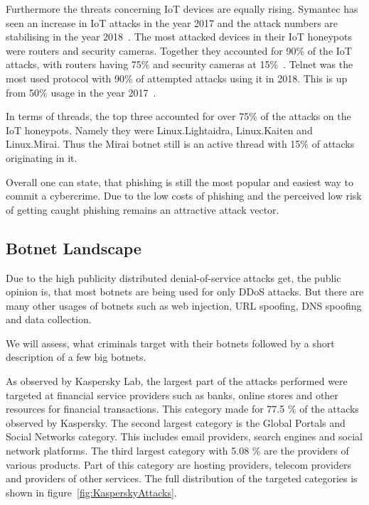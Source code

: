 Furthermore the threats concerning IoT devices are equally rising.
Symantec has seen an increase in IoT attacks in the year 2017 and the attack numbers are stabilising in the year 2018~\cite{Symantec19}.
The most attacked devices in their IoT honeypots were routers and security cameras.
Together they accounted for 90\% of the IoT attacks, with routers having 75\% and security cameras at 15\%~\cite{Symantec19}.
Telnet was the most used protocol with 90\% of attempted attacks using it in 2018.
This is up from 50\% usage in the year 2017~\cite{Symantec19}.

In terms of threads, the top three accounted for over 75\% of the attacks on the IoT honeypots.
Namely they were Linux.Lightaidra, Linux.Kaiten and Linux.Mirai.
Thus the Mirai botnet still is an active thread with 15\% of attacks originating in it.\cite{Symantec19}

Overall one can state, that phishing is still the most popular and easiest way to commit a cybercrime.
Due to the low costs of phishing and the perceived low risk of getting caught phishing remains an attractive attack vector.\cite{McAfee18}

\subsection{Botnet Landscape}

Due to the high publicity distributed denial-of-service attacks get, the public opinion is, that most botnets are being used for only DDoS attacks.
But there are many other usages of botnets such as web injection, URL spoofing, DNS spoofing and data collection.\cite{Eremin19}

We will assess, what criminals target with their botnets followed by a short description of a few big botnets.

As observed by Kaspersky Lab, the largest part of the attacks performed were targeted at financial service providers such as banks, online stores and other resources for financial transactions.
This category made for 77.5 \% of the attacks observed by Kaspersky.
The second largest category is the Global Portals and Social Networks category.
This includes email providers, search engines and social network platforms.\cite{Eremin19}
The third largest category with 5.08 \% are the providers of various products.
Part of this category are hosting providers, telecom providers and providers of other services.
The full distribution of the targeted categories is shown in figure~\ref{fig:KasperskyAttacks}.

